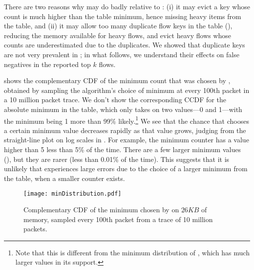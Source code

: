 There are two reasons why \TheSystem may do badly relative to \spacesaving: (i)
it may evict a key whose count is much higher than the table minimum, hence
missing heavy items from the table, and (ii) it may allow too many duplicate
flow keys in the table (), reducing the memory available
for heavy flows, and evict heavy flows whose counts are underestimated due to
the duplicates. We showed that duplicate keys are not very prevalent in
; in what follows, we understand their effects on false
negatives in the reported top $k$ flows.

 shows the complementary CDF of the minimum count that was chosen
by \TheSystem, obtained by sampling the algorithm's choice of minimum at every
100th packet in a 10 million packet trace. We don't show the corresponding CCDF
for the absolute minimum in the table, which only takes on two values---0 and
1---with the minimum being 1 more than 99\% likely.\footnote{Note that this is
  different from the minimum distribution of \spacesaving, which has much larger
  values in its support.}
%
We see that the chance that \TheSystem chooses a certain minimum value decreases
rapidly as that value grows, judging from the straight-line plot on log scales
in .
%
For example, the minimum counter has a value higher than 5 less than 5\% of the
time. There are a few larger minimum values (), but they are rarer (less
than 0.01\% of the time). This suggests that it is unlikely that \TheSystem
experiences large errors due to the choice of a larger minimum from the table,
when a smaller counter exists.

\begin{figure}[h]
\texttt{[image: minDistribution.pdf]}
\caption{Complementary CDF of the minimum chosen by \TheSystem on $26KB$ of
  memory, sampled every 100th packet from a trace of 10 million packets.}
\label{fig:mindist}
\end{figure}

